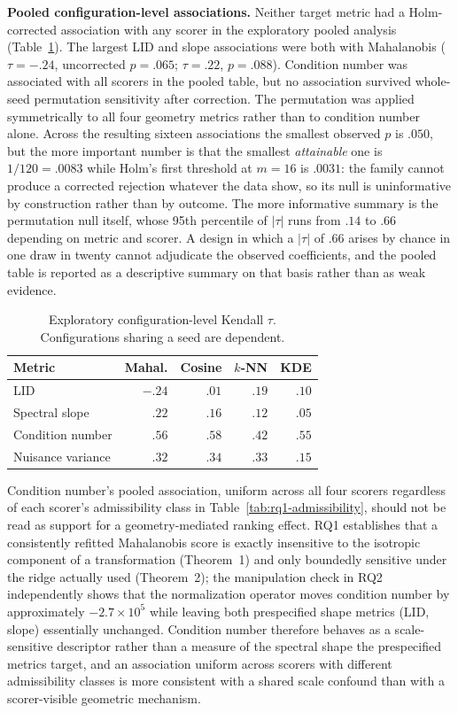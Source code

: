 \documentclass[pdflatex,sn-basic]{sn-jnl}
\theoremstyle{plain}
\theoremstyle{definition}
\theoremstyle{remark}
\begin{document}
\textbf{Pooled configuration-level associations.} Neither target metric had a Holm-corrected association with any scorer in the exploratory pooled analysis (Table~\ref{tab:rq2}). The largest LID and slope associations were both with Mahalanobis ($\tau=-.24$, uncorrected $p=.065$; $\tau=.22$, $p=.088$). Condition number was associated with all scorers in the pooled table, but no association survived whole-seed permutation sensitivity after correction. The permutation was applied symmetrically to all four geometry metrics rather than to condition number alone. Across the resulting sixteen associations the smallest observed $p$ is $.050$, but the more important number is that the smallest \emph{attainable} one is $1/120=.0083$ while Holm's first threshold at $m=16$ is $.0031$: the family cannot produce a corrected rejection whatever the data show, so its null is uninformative by construction rather than by outcome. The more informative summary is the permutation null itself, whose 95th percentile of $|\tau|$ runs from $.14$ to $.66$ depending on metric and scorer. A design in which a $|\tau|$ of $.66$ arises by chance in one draw in twenty cannot adjudicate the observed coefficients, and the pooled table is reported as a descriptive summary on that basis rather than as weak evidence.

\begin{table}[t]
\centering
\caption{Exploratory configuration-level Kendall $\tau$. Configurations sharing a seed are dependent.}
\label{tab:rq2}
\small
\begin{tabular}{lrrrr}
\toprule
Metric & Mahal. & Cosine & $k$-NN & KDE\\
\midrule
LID & $-.24$ & $.01$ & $.19$ & $.10$\\
Spectral slope & $.22$ & $.16$ & $.12$ & $.05$\\
Condition number & $.56$ & $.58$ & $.42$ & $.55$\\
Nuisance variance & $.32$ & $.34$ & $.33$ & $.15$\\
\bottomrule
\end{tabular}
\end{table}

Condition number's pooled association, uniform across all four scorers regardless of each scorer's admissibility class in Table~\ref{tab:rq1-admissibility}, should not be read as support for a geometry-mediated ranking effect. RQ1 establishes that a consistently refitted Mahalanobis score is exactly insensitive to the isotropic component of a transformation (Theorem~1) and only boundedly sensitive under the ridge actually used (Theorem~2); the manipulation check in RQ2 independently shows that the normalization operator moves condition number by approximately $-2.7\times10^{5}$ while leaving both prespecified shape metrics (LID, slope) essentially unchanged. Condition number therefore behaves as a scale-sensitive descriptor rather than a measure of the spectral shape the prespecified metrics target, and an association uniform across scorers with different admissibility classes is more consistent with a shared scale confound than with a scorer-visible geometric mechanism.
\end{document}
